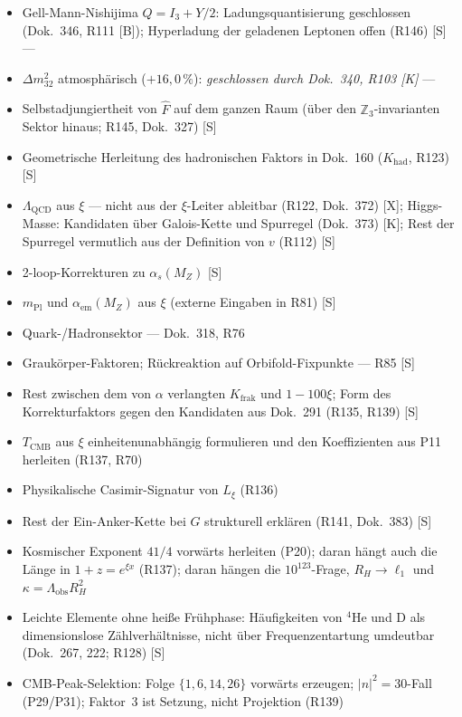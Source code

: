 \begin{itemize}
  \item Gell-Mann-Nishijima $Q=I_3+Y/2$: Ladungsquantisierung geschlossen (Dok.~346, R111 [B]); Hyperladung der geladenen Leptonen offen (R146) [S] ---
  \item $\Delta m_{32}^2$ atmosphärisch ($+16{,}0\,\%$): \emph{geschlossen durch Dok.~340, R103 [K]} ---
  \item Selbstadjungiertheit von $\hat{F}$ auf dem ganzen Raum (über den $\mathbb{Z}_3$-invarianten Sektor hinaus; R145, Dok.~327) [S]
  \item Geometrische Herleitung des hadronischen Faktors in Dok.~160 ($K_{\mathrm{had}}$, R123) [S]
  \item $\Lambda_{\mathrm{QCD}}$ aus $\xi$ --- nicht aus der $\xi$-Leiter ableitbar (R122, Dok.~372) [X]; Higgs-Masse: Kandidaten über Galois-Kette und Spurregel (Dok.~373) [K]; Rest der Spurregel vermutlich aus der Definition von $v$ (R112) [S]
  \item 2-loop-Korrekturen zu $\alpha_s(M_Z)$ [S]
  \item $m_{\mathrm{Pl}}$ und $\alpha_{\mathrm{em}}(M_Z)$ aus $\xi$ (externe Eingaben in R81) [S]
  \item Quark-/Hadronsektor --- Dok.~318, R76
  \item Grauk\"orper-Faktoren; R\"uckreaktion auf Orbifold-Fixpunkte --- R85 [S]
  \item Rest zwischen dem von $\alpha$ verlangten $K_{\mathrm{frak}}$ und $1-100\xi$; Form des Korrekturfaktors gegen den Kandidaten aus Dok.~291 (R135, R139) [S]
  \item $T_{\mathrm{CMB}}$ aus $\xi$ einheitenunabhängig formulieren und den Koeffizienten aus P11 herleiten (R137, R70)
  \item Physikalische Casimir-Signatur von $L_\xi$ (R136)
  \item Rest der Ein-Anker-Kette bei $G$ strukturell erklären (R141, Dok.~383) [S]
  \item Kosmischer Exponent $41/4$ vorw\"arts herleiten (P20); daran hängt auch die Länge in $1+z=e^{\xi x}$ (R137); daran h\"angen die $10^{123}$-Frage, $R_H\to\ell_1$ und $\kappa = \Lambda_{\mathrm{obs}}R_H^2$
  \item Leichte Elemente ohne heiße Frühphase: Häufigkeiten von $^4$He und D als dimensionslose Zählverhältnisse, nicht über Frequenzentartung umdeutbar (Dok.~267, 222; R128) [S]
  \item CMB-Peak-Selektion: Folge $\{1,6,14,26\}$ vorw\"arts erzeugen; $|n|^2{=}30$-Fall (P29/P31); Faktor~3 ist Setzung, nicht Projektion (R139)

\end{itemize}
